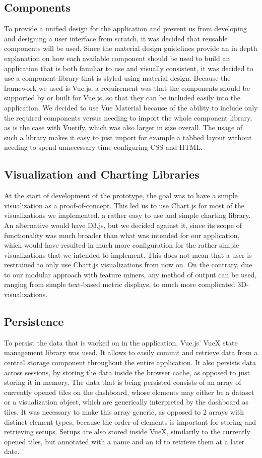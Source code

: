  \subsection{Components}
 To provide a unified design for the application and prevent us from developing and designing a user interface from scratch, it was decided that reusable components will be used. Since the material design guidelines provide an in depth explanation on how each available component should be used to build an application that is both familiar to use and visually consistent, it was decided to use a component-library that is styled using material design. Because the framework we used is Vue.js, a requirement was that the components should be supported by or built for Vue.js, so that they can be included easily into the application. We decided to use Vue Material because of the ability to include only the required components versus needing to import the whole component library, as is the case with Vuetify, which was also larger in size overall. The usage of such a library makes it easy to just import for example a tabbed layout without needing to spend unnecessary time configuring CSS and HTML.
 \subsection{Visualization and Charting Libraries}
 At the start of development of the prototype, the goal was to have a simple visualization as a proof-of-concept. This led us to use Chart.js for most of the visualizations we implemented, a rather easy to use and simple charting library. An alternative would have D3.js, but we decided against it, since its scope of functionality was much broader than what was intended for our application, which would have resulted in much more configuration for the rather simple visualizations that we intended to implement. This does not mean that a user is restrained to only use Chart.js visualizations from now on. On the contrary, due to our modular approach with feature miners, any method of output can be used, ranging from simple text-based metric displays, to much more complicated 3D-visualizations.
 \subsection{Persistence}
 To persist the data that is worked on in the application, Vue.js' VueX state management library was used. It allows to easily commit and retrieve data from a central storage component throughout the entire application. It also persists data across sessions, by storing the data inside the browser cache, as opposed to just storing it in memory. The data that is being persisted consists of an array of currently opened tiles on the dashboard, whose elements may either be a dataset or a visualization object, which are generically interpreted by the dashboard as tiles. It was necessary to make this array generic, as opposed to 2 arrays with distinct element types, because the order of elements is important for storing and retrieving setups. Setups are also stored inside VueX, similarily to the currently opened tiles, but annotated with a name and an id to retrieve them at a later date. 
